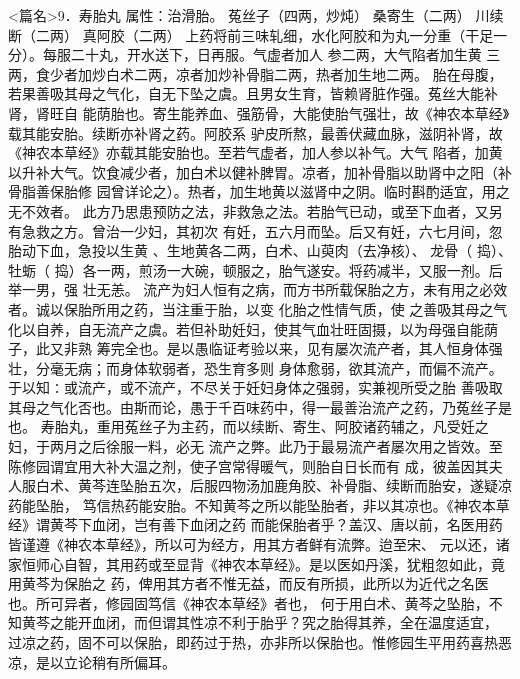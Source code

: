 \documentclass[a4paper,12pt,UTF8,twoside]{ctexbook}
\begin{document}
<篇名>9．寿胎丸
属性：治滑胎。 
菟丝子（四两，炒炖） 桑寄生（二两） 川续断（二两） 真阿胶（二两） 
上药将前三味轧细，水化阿胶和为丸一分重（干足一分）。每服二十丸，开水送下，日再服。气虚者加人 
参二两，大气陷者加生黄 三两，食少者加炒白术二两，凉者加炒补骨脂二两，热者加生地二两。 
胎在母腹，若果善吸其母之气化，自无下坠之虞。且男女生育，皆赖肾脏作强。菟丝大能补肾，肾旺自 
能荫胎也。寄生能养血、强筋骨，大能使胎气强壮，故《神农本草经》载其能安胎。续断亦补肾之药。阿胶系 
驴皮所熬，最善伏藏血脉，滋阴补肾，故《神农本草经》亦载其能安胎也。至若气虚者，加人参以补气。大气 
陷者，加黄 以升补大气。饮食减少者，加白术以健补脾胃。凉者，加补骨脂以助肾中之阳（补骨脂善保胎修 
园曾详论之）。热者，加生地黄以滋肾中之阴。临时斟酌适宜，用之无不效者。 
此方乃思患预防之法，非救急之法。若胎气已动，或至下血者，又另有急救之方。曾治一少妇，其初次 
有妊，五六月而坠。后又有妊，六七月间，忽胎动下血，急投以生黄 、生地黄各二两，白术、山萸肉（去净核）、 
龙骨（ 捣）、牡蛎（ 捣）各一两，煎汤一大碗，顿服之，胎气遂安。将药减半，又服一剂。后举一男，强 
壮无恙。 
流产为妇人恒有之病，而方书所载保胎之方，未有用之必效者。诚以保胎所用之药，当注重于胎，以变 
化胎之性情气质，使 
之善吸其母之气化以自养，自无流产之虞。若但补助妊妇，使其气血壮旺固摄，以为母强自能荫子，此又非熟 
筹完全也。是以愚临证考验以来，见有屡次流产者，其人恒身体强壮，分毫无病；而身体软弱者，恐生育多则 
身体愈弱，欲其流产，而偏不流产。于以知∶或流产，或不流产，不尽关于妊妇身体之强弱，实兼视所受之胎 
善吸取其母之气化否也。由斯而论，愚于千百味药中，得一最善治流产之药，乃菟丝子是也。 
寿胎丸，重用菟丝子为主药，而以续断、寄生、阿胶诸药辅之，凡受妊之妇，于两月之后徐服一料，必无 
流产之弊。此乃于最易流产者屡次用之皆效。至陈修园谓宜用大补大温之剂，使子宫常得暖气，则胎自日长而有 
成，彼盖因其夫人服白术、黄芩连坠胎五次，后服四物汤加鹿角胶、补骨脂、续断而胎安，遂疑凉药能坠胎， 
笃信热药能安胎。不知黄芩之所以能坠胎者，非以其凉也。《神农本草经》谓黄芩下血闭，岂有善下血闭之药 
而能保胎者乎？盖汉、唐以前，名医用药皆谨遵《神农本草经》，所以可为经方，用其方者鲜有流弊。迨至宋、 
元以还，诸家恒师心自智，其用药或至显背《神农本草经》。是以医如丹溪，犹粗忽如此，竟用黄芩为保胎之 
药，俾用其方者不惟无益，而反有所损，此所以为近代之名医也。所可异者，修园固笃信《神农本草经》者也， 
何于用白术、黄芩之坠胎，不知黄芩之能开血闭，而但谓其性凉不利于胎乎？究之胎得其养，全在温度适宜， 
过凉之药，固不可以保胎，即药过于热，亦非所以保胎也。惟修园生平用药喜热恶凉，是以立论稍有所偏耳。 
\end{document}
